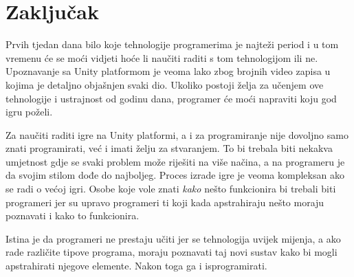 \section{Zaključak}
Prvih tjedan dana bilo koje tehnologije programerima je najteži period i u tom vremenu će se moći vidjeti hoće li naučiti raditi s tom tehnologijom ili ne. Upoznavanje sa Unity platformom je veoma lako zbog brojnih video zapisa u kojima je detaljno objašnjen svaki dio. Ukoliko postoji želja za učenjem ove tehnologije i ustrajnost od godinu dana, programer će moći napraviti koju god igru poželi.

Za naučiti raditi igre na Unity platformi, a i za programiranje nije dovoljno samo znati programirati, već i imati želju za stvaranjem. To bi trebala biti nekakva umjetnost gdje se svaki problem može riješiti na više načina, a na programeru je da svojim stilom dođe do najboljeg. Proces izrade igre je veoma kompleksan ako se radi o većoj igri. Osobe koje vole znati \emph{kako} nešto funkcionira bi trebali biti programeri jer su upravo programeri ti koji kada apstrahiraju nešto moraju poznavati i kako to funkcionira.
 
Istina je da programeri ne prestaju učiti jer se tehnologija uvijek mijenja, a ako rade različite tipove programa, moraju poznavati taj novi sustav kako bi mogli apstrahirati njegove elemente. Nakon toga ga i isprogramirati.